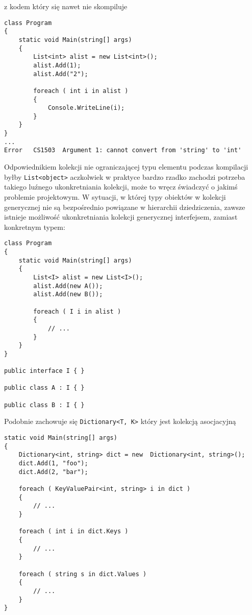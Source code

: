 z kodem który się nawet nie skompiluje

\begin{scriptsize}
\begin{verbatim}
class Program
{
    static void Main(string[] args)
    {
        List<int> alist = new List<int>();
        alist.Add(1);
        alist.Add("2");

        foreach ( int i in alist )
        {
            Console.WriteLine(i);
        }
    }
}
...
Error	CS1503	Argument 1: cannot convert from 'string' to 'int'	
\end{verbatim}
\end{scriptsize}

Odpowiednikiem kolekcji nie ograniczającej typu elementu podczas kompilacji byłby {\tt List<object>} aczkolwiek
w praktyce bardzo rzadko zachodzi potrzeba takiego luźnego ukonkretniania kolekcji, może to wręcz świadczyć
o jakimś problemie projektowym. W sytuacji, w której typy obiektów w kolekcji generycznej nie są bezpośrednio powiązane
w hierarchii dziedziczenia, zawsze istnieje możliwość ukonkretniania kolekcji generycznej interfejsem, zamiast konkretnym typem:

\begin{scriptsize}
\begin{verbatim}
class Program
{
    static void Main(string[] args)
    {
        List<I> alist = new List<I>();
        alist.Add(new A());
        alist.Add(new B());

        foreach ( I i in alist )
        {
            // ...
        }
    } 
}

public interface I { }

public class A : I { }

public class B : I { }
\end{verbatim}
\end{scriptsize}

Podobnie zachowuje się {\tt Dictionary<T, K>} który jest kolekcją asocjacyjną

\begin{scriptsize}
\begin{verbatim}
static void Main(string[] args)
{
    Dictionary<int, string> dict = new  Dictionary<int, string>();
    dict.Add(1, "foo");
    dict.Add(2, "bar");

    foreach ( KeyValuePair<int, string> i in dict )
    {
        // ...
    }

    foreach ( int i in dict.Keys )
    {
        // ...
    }

    foreach ( string s in dict.Values )
    {
        // ...
    }
} 
\end{verbatim}
\end{scriptsize}

